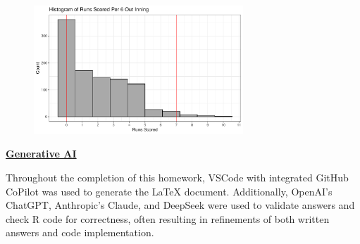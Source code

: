 \documentclass[12pt]{article}
\begin{document}
\begin{figure}[h]
    \centering
    \includegraphics[width=0.7\textwidth]{q8b_plot.pdf}
\end{figure}

{\underline{\bf Generative AI}}  

Throughout the completion of this homework, VSCode with integrated GitHub CoPilot was used
to generate the LaTeX document. Additionally, OpenAI's ChatGPT, Anthropic's Claude, and DeepSeek were 
used to validate answers and check R code for correctness, often resulting in refinements of both written
answers and code implementation.
\end{document}
